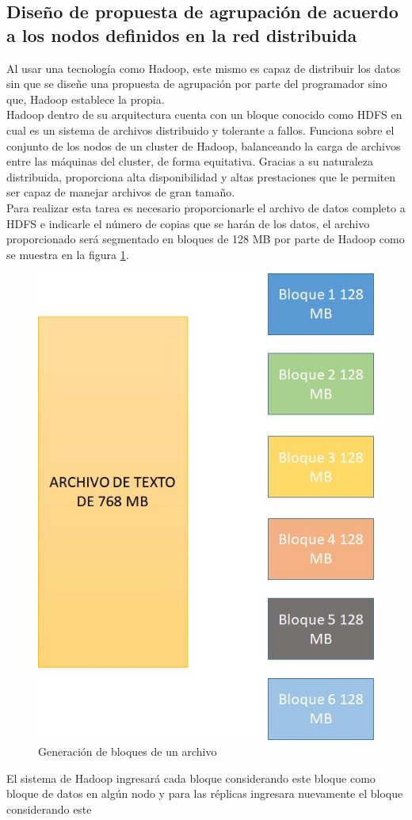 \subsection{Diseño de propuesta de agrupación de acuerdo a los nodos definidos en la red distribuida}

Al usar una tecnología como Hadoop, este mismo es capaz de distribuir los datos sin que se diseñe una
propuesta de agrupación por parte del programador sino que, Hadoop establece la propia.
\\
Hadoop dentro de su arquitectura cuenta con un bloque conocido como HDFS en cual es un sistema de archivos distribuido y tolerante a fallos. Funciona sobre el conjunto de los nodos
de un cluster de Hadoop, balanceando la carga de archivos entre las máquinas del cluster,
de forma equitativa. Gracias a su naturaleza distribuida, proporciona alta disponibilidad y
altas prestaciones que le permiten ser capaz de manejar archivos de gran tamaño.
\\
Para realizar esta tarea es necesario proporcionarle el archivo de datos completo a HDFS e indicarle el número de copias que se harán de los datos,  el archivo proporcionado será segmentado en bloques de 128 MB por parte de Hadoop como se muestra en la figura \ref{fig:red2}.
\begin{figure}[!htbp]
	\hypertarget{fig:red2}{\hspace{1pt}}
	\begin{center}
		\includegraphics[width=.4\textwidth]{capitulo3/images/im2.png}
		\caption{Generación de bloques de un archivo}
		\label{fig:red2}
	\end{center}
\end{figure}
\newpage
El sistema de Hadoop ingresará cada bloque considerando este bloque como bloque de
datos en algún nodo y para las réplicas ingresara nuevamente el bloque considerando este
